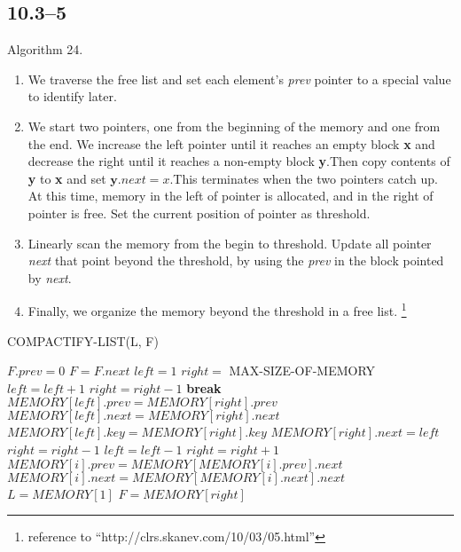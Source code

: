 \documentclass{article}
\begin{document}
\subsection*{10.3--5}
Algorithm 24.\\
\begin{enumerate}
\item We traverse the free list and set each element's \textit{prev} pointer to a special value to identify later.
\item We start two pointers, one from the beginning of the memory and one from the end. We increase the left pointer until it reaches an empty block \textbf{x} and decrease the right until it reaches a non-empty block \textbf{y}.Then copy contents of \textbf{y} to \textbf{x} and set $\mathbf{y}.next = x$.This terminates when the two pointers catch up. At this time, memory in the left of pointer is allocated, and in the right of pointer is free. Set the current position of pointer as threshold.
\item Linearly scan the memory from the begin to threshold. Update all pointer \textit{next} that point beyond the threshold, by using the \textit{prev} in the block pointed by \textit{next}.
\item Finally, we organize the memory beyond the threshold in a free list.
\footnote{reference to ``http://clrs.skanev.com/10/03/05.html'' }
\end{enumerate}

\begin{algorithm}
  \caption{COMPACTIFY-LIST(L, F)}
  \begin{algorithmic}[1]
    \STATE $F.prev = 0$
    \STATE $F = F.next$
    \ENDWHILE
    \STATE $left = 1$
    \STATE $right =$ MAX-SIZE-OF-MEMORY
    \WHILE {\TRUE}
    \STATE $left = left + 1$
    \ENDWHILE
    \STATE $right = right - 1$
    \ENDWHILE
    \STATE \textbf{break}
    \ENDIF
    \STATE $MEMORY[left].prev = MEMORY[right].prev$
    \STATE $MEMORY[left].next = MEMORY[right].next$
    \STATE $MEMORY[left].key = MEMORY[right].key$
    \STATE $MEMORY[right].next = left$
    \STATE $right = right - 1$
    \STATE $left = left - 1$
    \ENDWHILE
    \STATE $right = right + 1$
    \STATE $MEMORY[i].prev = MEMORY[MEMORY[i].prev].next$
    \ENDIF
    \STATE $MEMORY[i].next = MEMORY[MEMORY[i].next].next$
    \ENDIF
    \ENDFOR
    \STATE $L = MEMORY[1]$
    \STATE $F = MEMORY[right]$
  \end{algorithmic}
\end{algorithm}
\end{document}
